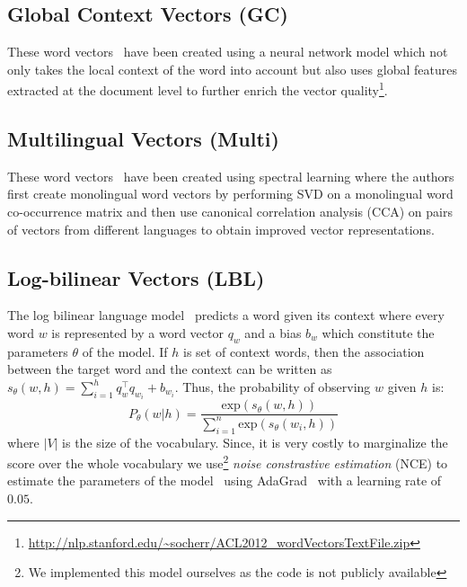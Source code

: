 \documentclass[11pt]{article}
\begin{document}
\subsection{Global Context Vectors (GC)}
\label{sec:gc}

These word vectors~\cite{huang2012improving} have been created using a neural network model which not only takes the local context of the word into account but also uses global features extracted at the document level to further enrich the vector quality\footnote{\url{http://nlp.stanford.edu/~socherr/ACL2012_wordVectorsTextFile.zip}}.

\subsection{Multilingual Vectors (Multi)}
\label{sec:multi}

These word vectors~\cite{faruqui-dyer:2014:EACL2014} have been created using spectral learning where the authors first create monolingual word vectors by performing SVD on a monolingual word co-occurrence matrix and then use canonical correlation analysis (CCA) on pairs of vectors from different languages to obtain improved vector representations.

\subsection{Log-bilinear Vectors (LBL)}
\label{sec:lbl}

The log bilinear language model~\cite{MnihTeh2012} predicts a word given its
context where every word $w$ is represented by a word vector $q_w$ and a bias $b_w$ which constitute the parameters $\theta$ of the model. If $h$ is
set of context words, then the association between the target word and the context can be written
as $s_{\theta}(w, h) = \sum_{i=1}^{h}q_{w}^{\top}q_{w_{i}} + b_{w_{i}}$. Thus, the probability of observing $w$ given $h$ is:
\begin{equation}
  \label{equ:prob-lbl}
  P_{\theta}(w|h) = \frac{\text{exp}(s_{\theta}(w, h))}{\sum_{i=1}^{n}\text{exp}(s_{\theta}(w_{i}, h))}
\end{equation}
where $|V|$ is the size of the vocabulary. Since, it is very costly to marginalize the score over the
whole vocabulary we use\footnote{We implemented this model ourselves as the code is not publicly available} \textit{noise constrastive estimation} (NCE) to estimate the parameters of the model~\cite{MnihTeh2012} using AdaGrad~\cite{Duchi:EECS-2010-24} with a learning rate of $0.05$.
\end{document}
